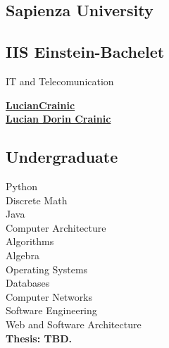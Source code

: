 \documentclass[a4paper]{MagicalCV}
\let\olditem\item
\renewcommand\item{\olditem\justifying}
\begin{document}
\lastupdated

 

\begin{minipage}[t]{0.32\textwidth} 


\subsection{Sapienza University}
\vspace{\topsep} %
\begin{tightemize}
\item 
\end{tightemize}
\sectionsep

\subsection{IIS Einstein-Bachelet}
\begin{tightemize}
\item IT and Telecomunication
\end{tightemize}
\sectionsep


 \href{https://github.com/LucianCrainic}{\bf LucianCrainic}\\
 \href{https://www.linkedin.com/in/lucian-dorin-crainic-705510183/}{\bf Lucian Dorin Crainic}
\sectionsep


\subsection{Undergraduate}
Python \\
Discrete Math \\
Java \\
Computer Architecture \\
Algorithms \\
Algebra \\
Operating Systems \\
Databases \\
Computer Networks \\
Software Engineering \\
Web and Software Architecture \\
\textbf{Thesis: TBD.}
\sectionsep


\end{minipage}
\end{document}
